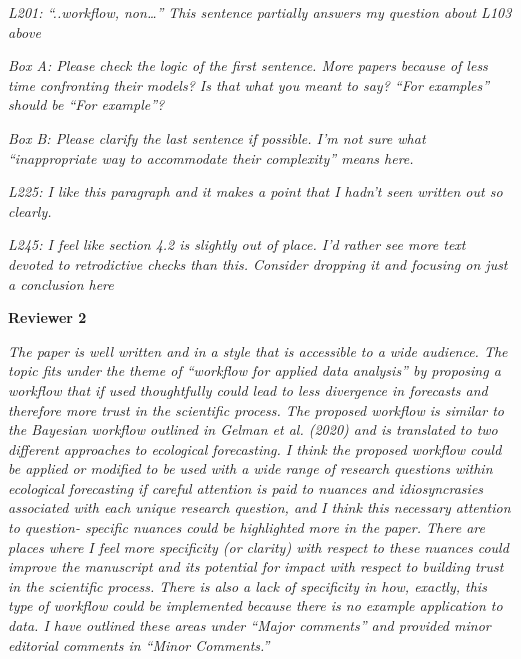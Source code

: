 \documentclass[11pt,letter]{article}
\begin{document}
\begin{mybox}
\emph{L201: “..workflow, non…” This sentence partially answers my question about L103 above}
\end{mybox}

\begin{mybox}
\emph{Box A: Please check the logic of the first sentence. More papers because of less time confronting their models? Is that what you meant to say? “For examples” should be “For example”?}
\end{mybox} 

\begin{mybox}
\emph{Box B: Please clarify the last sentence if possible. I’m not sure what “inappropriate way to accommodate their complexity” means here.}
\end{mybox}

\begin{mybox}
\emph{L225: I like this paragraph and it makes a point that I hadn’t seen written out so clearly.}
\end{mybox}

\begin{mybox}
\emph{L245: I feel like section 4.2 is slightly out of place. I’d rather see more text devoted to retrodictive checks than this. Consider dropping it and focusing on just a conclusion here}
\end{mybox}

{\bf Reviewer 2}

\begin{mybox}
\emph{The paper is well written and in a style that is accessible to a wide audience. The topic fits
under the theme of “workflow for applied data analysis” by proposing a workflow that if used
thoughtfully could lead to less divergence in forecasts and therefore more trust in the scientific
process. The proposed workflow is similar to the Bayesian workflow outlined in Gelman et
al. (2020) and is translated to two different approaches to ecological forecasting. I think
the proposed workflow could be applied or modified to be used with a wide range of research
questions within ecological forecasting if careful attention is paid to nuances and idiosyncrasies
associated with each unique research question, and I think this necessary attention to question-
specific nuances could be highlighted more in the paper. There are places where I feel more
specificity (or clarity) with respect to these nuances could improve the manuscript and its
potential for impact with respect to building trust in the scientific process. There is also a
lack of specificity in how, exactly, this type of workflow could be implemented because there
is no example application to data. I have outlined these areas under “Major comments” and
provided minor editorial comments in “Minor Comments.”}
\end{mybox}
\end{document}
